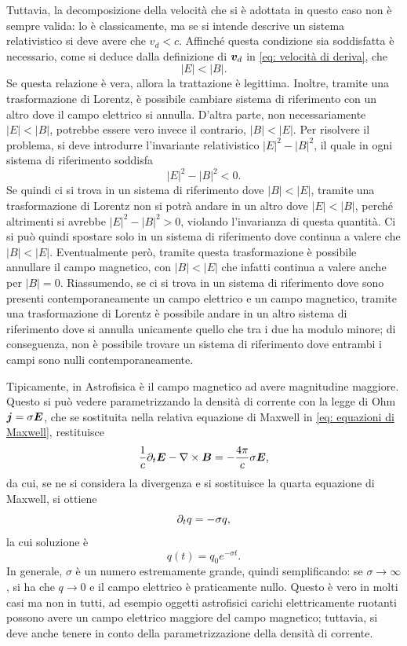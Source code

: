 Tuttavia, la decomposizione della velocità che si è adottata in questo caso non è sempre valida: lo è classicamente, ma se si intende descrive un sistema relativistico si deve avere che $v_d < c$. Affinché questa condizione sia soddisfatta è necessario, come si deduce dalla definizione di $\bm{v}_d$ in \eqref{eq: velocità di deriva}, che 
\begin{equation}
    |E| < |B|.
\end{equation}
Se questa relazione è vera, allora la trattazione è legittima. Inoltre, tramite una trasformazione di Lorentz, è possibile cambiare sistema di riferimento con un altro dove il campo elettrico si annulla. D'altra parte, non necessariamente $|E| < |B|$, potrebbe essere vero invece il contrario, $|B| < |E|$. Per risolvere il problema, si deve introdurre l'invariante relativistico $|E|^2 - |B|^2$, il quale in ogni sistema di riferimento soddisfa
\begin{equation}
    |E|^2 - |B|^2 < 0.
\end{equation}
Se quindi ci si trova in un sistema di riferimento dove $|B| < |E|$, tramite una trasformazione di Lorentz non si potrà andare in un altro dove $|E| < |B|$, perché altrimenti si avrebbe $|E|^2 - |B|^2 > 0$, violando l'invarianza di questa quantità. Ci si può quindi spostare solo in un sistema di riferimento dove continua a valere che $|B| < |E|$. Eventualmente però, tramite questa trasformazione è possibile annullare il campo magnetico, con $|B| < |E|$ che infatti continua a valere anche per $|B| = 0$. Riassumendo, se ci si trova in un sistema di riferimento dove sono presenti contemporaneamente un campo elettrico e un campo magnetico, tramite una trasformazione di Lorentz è possibile andare in un altro sistema di riferimento dove si annulla unicamente quello che tra i due ha modulo minore; di conseguenza, non è possibile trovare un sistema di riferimento dove entrambi i campi sono nulli contemporaneamente. 

Tipicamente, in Astrofisica è il campo magnetico ad avere magnitudine maggiore. Questo si può vedere parametrizzando la densità di corrente con la legge di Ohm $\bm{j} = \sigma \bm{E}$, che se sostituita nella relativa equazione di Maxwell in \eqref{eq: equazioni di Maxwell}, restituisce
\begin{equation}
    \frac{1}{c}\partial_t\bm{E} - \nabla \times \bm{B} = -\frac{4\pi}{c}\sigma\bm{E},
\end{equation}
da cui, se ne si considera la divergenza e si sostituisce la quarta equazione di Maxwell, si ottiene
\begin{equation}
    \partial_tq = -\sigma q,
\end{equation}
la cui soluzione è
\begin{equation}
    q(t) = q_0e^{-\sigma t}.
\end{equation}
In generale, $\sigma$ è un numero estremamente grande, quindi semplificando: se $\sigma \to \infty$, si ha che $q \to 0$ e il campo elettrico è praticamente nullo. Questo è vero in molti casi ma non in tutti, ad esempio oggetti astrofisici carichi elettricamente ruotanti possono avere un campo elettrico maggiore del campo magnetico; tuttavia, si deve anche tenere in conto della parametrizzazione della densità di corrente. 

